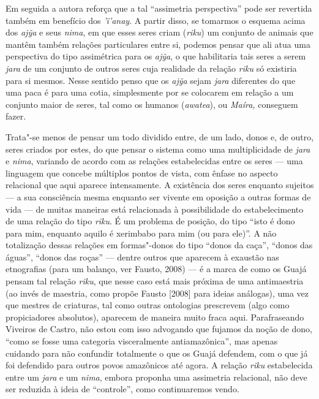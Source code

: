 Em seguida a autora reforça que a tal ``assimetria perspectiva'' pode ser
revertida também em benefício dos \emph{'ï'anay}. A partir disso, se
tomarmos o esquema acima dos \emph{ajỹa} e seus \emph{nima}, em que
esses seres criam (\emph{riku}) um conjunto de animais que mantêm também
relações particulares entre si, podemos pensar que ali atua uma
perspectiva do tipo assimétrica para os \emph{ajỹa}, o que habilitaria
tais seres a serem \emph{jara} de um conjunto de outros seres cuja
realidade da relação \emph{riku} só existiria para si mesmos. Nesse
sentido penso que os \emph{ajỹa} sejam \emph{jara} diferentes do que uma
paca é para uma cotia, simplesmente por se colocarem em relação a um
conjunto maior de seres, tal como os humanos (\emph{awatea}), ou
\emph{Maíra,} conseguem fazer.

Trata"-se menos de pensar um todo dividido entre, de um lado, donos e, de
outro, seres criados por estes, do que pensar o sistema como uma
multiplicidade de \emph{jara} e \emph{nima}, variando de acordo com as
relações estabelecidas entre os seres --- uma linguagem que concebe
múltiplos pontos de vista, com ênfase no aspecto relacional que aqui
aparece intensamente. A existência dos seres enquanto sujeitos --- a sua
consciência mesma enquanto ser vivente em oposição a outras formas de
vida --- de muitas maneiras está relacionada à possibilidade do
estabelecimento de uma relação do tipo \emph{riku}. É um problema de
posição, do tipo ``isto é dono para mim, enquanto aquilo é xerimbabo
para mim (ou para ele)''. A não totalização dessas relações em
formas"-donos do tipo ``donos da caça'', ``donos das águas'', ``donos das
roças'' --- dentre outros que aparecem à exaustão nas etnografias (para um
balanço, ver Fausto, 2008) --- é a marca de como os Guajá pensam tal
relação \emph{riku}, que nesse caso está mais próxima de uma
antimaestria (ao invés de maestria, como propõe Fausto {[}2008{]} para
ideias análogas), uma vez que mestres de criaturas, tal como outras
ontologias prescrevem (algo como propiciadores absolutos), aparecem de
maneira muito fraca aqui. Parafraseando Viveiros de Castro, não estou
com isso advogando que fujamos da noção de dono, ``como se fosse uma
categoria visceralmente antiamazônica'', mas apenas cuidando para não
confundir totalmente o que os Guajá defendem, com o que já foi defendido
para outros povos amazônicos até agora. A relação \emph{riku}
estabelecida entre um \emph{jara} e um \emph{nima}, embora proponha uma
assimetria relacional, não deve ser reduzida à ideia de ``controle'', como
continuaremos vendo.

